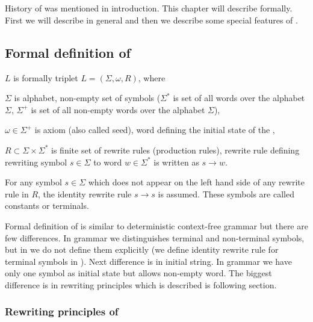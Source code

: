 
\chapter{\lsystem}

History of \lsystem was mentioned in introduction.
This chapter will describe \lsystem formally.
First we will describe \lsystem in general and then we describe some special features of \lsystem.


\section{Formal definition of \lsystem}

\lsystem $L$ is formally triplet $L = (\Sigma, \omega, R)$, where

\begin{itemize*}
	\item $\Sigma$ is alphabet, non-empty set of symbols ($\Sigma^{*}$ is set of all words over the alphabet $\Sigma$, $\Sigma^{+}$ is set of all non-empty words over the alphabet $\Sigma$),
	\item $\omega \in \Sigma^{+}$ is axiom (also called seed), word defining the initial state of the \lsystem,
	\item $R \subset \Sigma \times \Sigma^{*}$ is finite set of rewrite rules (production rules), rewrite rule defining rewriting symbol $s \in \Sigma$ to word $w \in \Sigma^{*}$ is written as $s \rightarrow w$.
\end{itemize*}

For any symbol $s \in \Sigma$ which does not appear on the left hand side of any rewrite rule in $R$, the identity rewrite rule $s \rightarrow s$ is assumed.
These symbols are called constants or terminals.

Formal definition of \lsystem is similar to deterministic context-free grammar but there are few differences.
In grammar we distinguishes terminal and non-terminal symbols, but in \lsystems we do not define them explicitly (we define identity rewrite rule for terminal symbols in \lsystems).
Next difference is in initial string.
In grammar we have only one symbol as initial state but \lsystem allows non-empty word.
The biggest difference is in rewriting principles which is described is following section.


\subsection{Rewriting principles of \lsystem}

